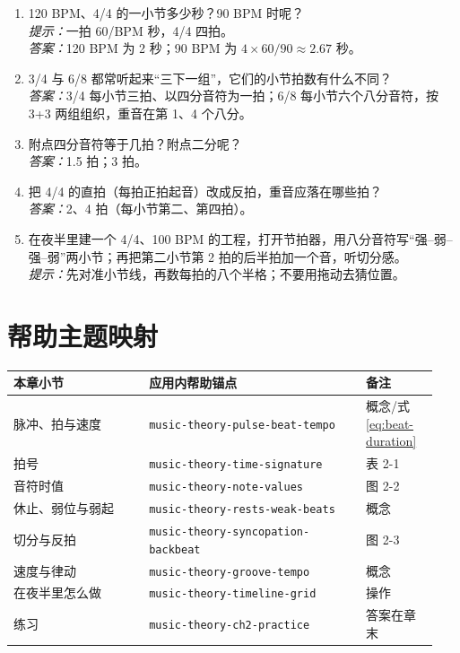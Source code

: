 \begin{exercise}
\begin{enumerate}
  \item 120 BPM、4/4 的一小节多少秒？90 BPM 时呢？\\
  \emph{提示：}一拍 60/BPM 秒，4/4 四拍。\\
  \emph{答案：}120 BPM 为 2 秒；90 BPM 为 \(4 \times 60/90 \approx 2.67\) 秒。
  \item 3/4 与 6/8 都常听起来“三下一组”，它们的小节拍数有什么不同？\\
  \emph{答案：}3/4 每小节三拍、以四分音符为一拍；6/8 每小节六个八分音符，按 3+3 两组组织，重音在第 1、4 个八分。
  \item 附点四分音符等于几拍？附点二分呢？\\
  \emph{答案：}1.5 拍；3 拍。
  \item 把 4/4 的直拍（每拍正拍起音）改成反拍，重音应落在哪些拍？\\
  \emph{答案：}2、4 拍（每小节第二、第四拍）。
  \item 在夜半里建一个 4/4、100 BPM 的工程，打开节拍器，用八分音符写“强–弱–强–弱”两小节；再把第二小节第 2 拍的后半拍加一个音，听切分感。\\
  \emph{提示：}先对准小节线，再数每拍的八个半格；不要用拖动去猜位置。
\end{enumerate}
\end{exercise}

\section{帮助主题映射}

\begin{center}
\footnotesize
\setlength{\tabcolsep}{3pt}
\begin{longtable}{p{0.30\linewidth}p{0.48\linewidth}p{0.16\linewidth}}
\toprule
本章小节 & 应用内帮助锚点 & 备注 \\
\midrule
\endhead
脉冲、拍与速度 & \texttt{music-theory-pulse-beat-tempo} & 概念/式 \eqref{eq:beat-duration} \\
拍号 & \texttt{music-theory-time-signature} & 表 2-1 \\
音符时值 & \texttt{music-theory-note-values} & 图 2-2 \\
休止、弱位与弱起 & \texttt{music-theory-rests-weak-beats} & 概念 \\
切分与反拍 & \texttt{music-theory-syncopation-backbeat} & 图 2-3 \\
速度与律动 & \texttt{music-theory-groove-tempo} & 概念 \\
在夜半里怎么做 & \texttt{music-theory-timeline-grid} & 操作 \\
练习 & \texttt{music-theory-ch2-practice} & 答案在章末 \\
\bottomrule
\end{longtable}
\end{center}

